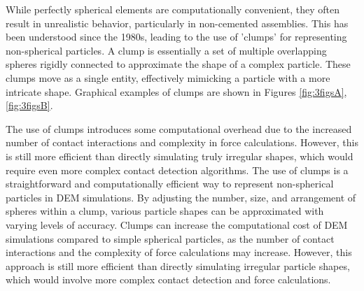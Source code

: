 While perfectly spherical elements are computationally convenient, they often result in unrealistic behavior, particularly in non-cemented assemblies. This has been understood since the 1980s, leading to the use of 'clumps' for representing non-spherical particles. A clump is essentially a set of multiple overlapping spheres rigidly connected to approximate the shape of a complex particle. These clumps move as a single entity, effectively mimicking a particle with a more intricate shape. Graphical examples of clumps are shown in Figures \ref{fig:3figsA}, \ref{fig:3figsB}.

The use of clumps introduces some computational overhead due to the increased number of contact interactions and complexity in force calculations. However, this is still more efficient than directly simulating truly irregular shapes, which would require even more complex contact detection algorithms. The use of clumps is a straightforward and computationally efficient way to represent non-spherical particles in DEM simulations. By adjusting the number, size, and arrangement of spheres within a clump, various particle shapes can be approximated with varying levels of accuracy. Clumps can increase the computational cost of DEM simulations compared to simple spherical particles, as the number of contact interactions and the complexity of force calculations may increase. However, this approach is still more efficient than directly simulating irregular particle shapes, which would involve more complex contact detection and force calculations.
